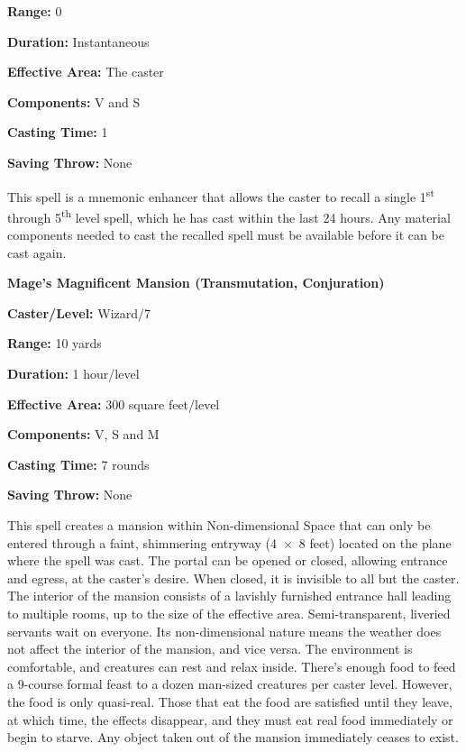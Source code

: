 \begin{multicols}{2}
\begin{minipage}{\columnwidth}
\noindent \textbf{Range:} 0

\noindent \textbf{Duration:} Instantaneous

\noindent \textbf{Effective Area:} The caster

\noindent \textbf{Components:} V and S

\noindent \textbf{Casting Time:} 1

\noindent \textbf{Saving Throw:} None

\end{minipage}

This spell is a mnemonic enhancer that allows the caster to recall a single 1\textsuperscript{st} through 5\textsuperscript{th} level spell, which he has cast within the last 24 hours.  Any material components needed to cast the recalled spell must be available before it can be cast again.

\vspace{1em}

\noindent
\begin{minipage}{\columnwidth}

\noindent \textbf{Mage's Magnificent Mansion (Transmutation, Conjuration)}

\noindent \textbf{Caster/Level:} Wizard/7

\noindent \textbf{Range:} 10 yards

\noindent \textbf{Duration:} 1 hour/level

\noindent \textbf{Effective Area:} 300 square feet/level

\noindent \textbf{Components:} V, S and M

\noindent \textbf{Casting Time:} 7 rounds

\noindent \textbf{Saving Throw:} None

\end{minipage}

This spell creates a mansion within Non-dimensional Space that can only be entered through a faint, shimmering entryway (4~$\times$~8 feet) located on the plane where the spell was cast.  The portal can be opened or closed, allowing entrance and egress, at the caster's desire.  When closed, it is invisible to all but the caster.  The interior of the mansion consists of a lavishly furnished entrance hall leading to multiple rooms, up to the size of the effective area.  Semi-transparent, liveried servants wait on everyone.  Its non-dimensional nature means the weather does not affect the interior of the mansion, and vice versa.  The environment is comfortable, and creatures can rest and relax inside.  There's enough food to feed a 9-course formal feast to a dozen man-sized creatures per caster level.  However, the food is only quasi-real.  Those that eat the food are satisfied until they leave, at which time, the effects disappear, and they must eat real food immediately or begin to starve.  Any object taken out of the mansion immediately ceases to exist.


\end{multicols}
